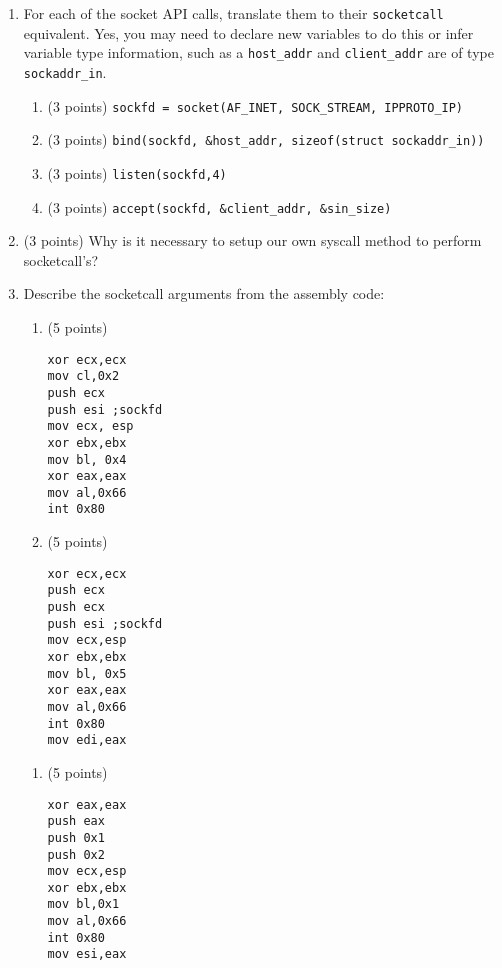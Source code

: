 \documentclass{article}[9pt]
\begin{document}
\begin{enumerate}
\item For each of the socket API calls, translate them to their
\texttt{socketcall} equivalent. Yes, you may need to declare new
variables to do this or infer variable type information, such as
a \texttt{host\_addr} and \texttt{client\_addr} are of type \texttt{sockaddr\_in}.

\begin{enumerate}
\item (3 points) \texttt{sockfd = socket(AF\_INET, SOCK\_STREAM, IPPROTO\_IP)}

\item (3 points) \texttt{bind(sockfd, \&host\_addr, sizeof(struct sockaddr\_in))}

\item (3 points) \texttt{listen(sockfd,4)}

\item (3 points) \texttt{accept(sockfd, \&client\_addr, \&sin\_size)}
\end{enumerate}

\item (3 points) Why is it necessary to setup our own syscall method to perform
socketcall's?

\item Describe the socketcall arguments from the assembly code:

\begin{enumerate}
\item (5 points)

\begin{verbatim}
xor ecx,ecx
mov cl,0x2
push ecx
push esi ;sockfd
mov ecx, esp
xor ebx,ebx
mov bl, 0x4
xor eax,eax
mov al,0x66
int 0x80
\end{verbatim}

\item (5 points) 

\begin{verbatim}
xor ecx,ecx
push ecx
push ecx
push esi ;sockfd
mov ecx,esp
xor ebx,ebx
mov bl, 0x5
xor eax,eax
mov al,0x66
int 0x80
mov edi,eax
\end{verbatim}
\end{enumerate}
\begin{enumerate}
\item (5 points)

\begin{verbatim}
xor eax,eax
push eax
push 0x1
push 0x2
mov ecx,esp
xor ebx,ebx
mov bl,0x1
mov al,0x66
int 0x80
mov esi,eax
\end{verbatim}


\end{enumerate}
\end{enumerate}
\end{document}

